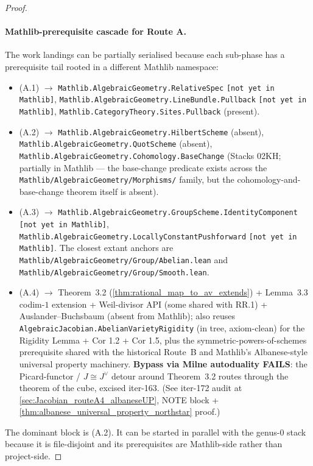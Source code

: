 \begin{proof}
  \paragraph{Mathlib-prerequisite cascade for Route A.}
  The work landings can be partially serialised because each sub-phase has a
  prerequisite tail rooted in a different Mathlib namespace:
  \begin{itemize}
    \item (A.1) \(\to\) \texttt{Mathlib.AlgebraicGeometry.RelativeSpec}
      \texttt{[not yet in Mathlib]},
      \texttt{Mathlib.AlgebraicGeometry.LineBundle.Pullback}
      \texttt{[not yet in Mathlib]},
      \texttt{Mathlib.CategoryTheory.Sites.Pullback} (present).
    \item (A.2) \(\to\) \texttt{Mathlib.AlgebraicGeometry.HilbertScheme}
      (absent),
      \texttt{Mathlib.AlgebraicGeometry.QuotScheme} (absent),
      \texttt{Mathlib.AlgebraicGeometry.Cohomology.BaseChange} (Stacks 02KH;
      partially in Mathlib --- the base-change predicate exists across the
      \texttt{Mathlib/AlgebraicGeometry/Morphisms/} family, but the
      cohomology-and-base-change theorem itself is absent).
    \item (A.3) \(\to\)
      \texttt{Mathlib.AlgebraicGeometry.GroupScheme.IdentityComponent}
      \texttt{[not yet in Mathlib]},
      \texttt{Mathlib.AlgebraicGeometry.LocallyConstantPushforward}
      \texttt{[not yet in Mathlib]}.
      The closest extant anchors are
      \texttt{Mathlib/AlgebraicGeometry/Group/Abelian.lean} and
      \texttt{Mathlib/AlgebraicGeometry/Group/Smooth.lean}.
    \item (A.4) \(\to\) Theorem~3.2 (\cref{thm:rational_map_to_av_extends})
      + Lemma~3.3 codim-\(1\) extension + Weil-divisor API (some shared with
      RR.1) + Auslander--Buchsbaum (absent from Mathlib); also reuses
      \texttt{AlgebraicJacobian.AbelianVarietyRigidity} (in tree,
      axiom-clean) for the Rigidity Lemma + Cor 1.2 + Cor 1.5, plus the
      symmetric-powers-of-schemes prerequisite shared with the historical
      Route~B and Mathlib's Albanese-style universal property machinery.
      \textbf{Bypass via Milne autoduality FAILS}: the Picard-functor /
      \(J \cong J^\vee\) detour around Theorem~3.2 routes through the
      theorem of the cube, excised iter-163. (See iter-172 audit at
      \cref{sec:Jacobian_routeA4_albaneseUP}, NOTE block +
      \cref{thm:albanese_universal_property_northstar} proof.)
  \end{itemize}
  The dominant block is (A.2). It can be started in parallel with the
  genus-\(0\) stack because it is file-disjoint and its prerequisites are
  Mathlib-side rather than project-side.

\end{proof}
